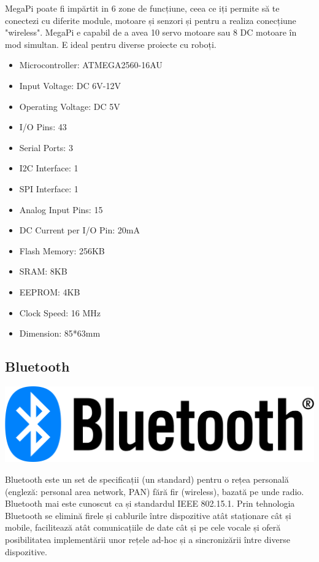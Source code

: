 \documentclass[12pt,a4paper]{article}
\begin{document}
	\par MegaPi poate fi impărtit in 6 zone de funcțiune, ceea ce iți permite să te conectezi cu diferite module, motoare și senzori și pentru a realiza conecțiune "wireless". MegaPi e capabil de a avea 10 servo motoare sau 8 DC motoare în mod simultan. E ideal pentru diverse proiecte cu roboți.
	
	\begin{itemize}
		\item Microcontroller: ATMEGA2560-16AU
		\item Input Voltage: DC 6V-12V
		\item Operating Voltage: DC 5V
		\item I/O Pins: 43
		\item Serial Ports: 3
		\item I2C Interface: 1
		\item SPI Interface: 1
		\item Analog Input Pins: 15
		\item DC Current per I/O Pin: 20mA
		\item Flash Memory: 256KB
		\item SRAM: 8KB
		\item EEPROM: 4KB
		\item Clock Speed: 16 MHz
		\item Dimension: 85*63mm
	\end{itemize}
	
	\subsection{Bluetooth}
	
	\begin{center}
		\includegraphics[scale=0.25]{bluetoothlogo.png}
	\end{center}
	
	\par Bluetooth este un set de specificații (un standard) pentru o rețea personală (engleză: personal area network, PAN) fără fir (wireless), bazată pe unde radio. Bluetooth mai este cunoscut ca și standardul IEEE 802.15.1. Prin tehnologia Bluetooth se elimină firele și cablurile între dispozitive atât staționare cât și mobile, facilitează atât comunicațiile de date cât și pe cele vocale și oferă posibilitatea implementării unor rețele ad-hoc și a sincronizării între diverse dispozitive.
	
\end{document}
